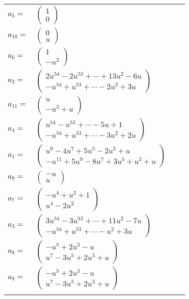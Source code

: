 \documentclass[1p]{elsarticle_modified}
\theoremstyle{definition}
\begin{document}
\begin{tabular}{m{7pt} m{180pt} m{7pt} m{180pt} }
\flushright $a_{5}=$&$\begin{pmatrix}1\\0\end{pmatrix}$ \\
\flushright $a_{10}=$&$\begin{pmatrix}0\\u\end{pmatrix}$ \\
\flushright $a_{6}=$&$\begin{pmatrix}1\\- u^2\end{pmatrix}$ \\
\flushright $a_{2}=$&$\begin{pmatrix}2 u^{54}-2 u^{53}+\cdots+13 u^2-6 u\\- u^{54}+u^{53}+\cdots-2 u^2+3 u\end{pmatrix}$ \\
\flushright $a_{11}=$&$\begin{pmatrix}u\\- u^3+u\end{pmatrix}$ \\
\flushright $a_{4}=$&$\begin{pmatrix}u^{54}- u^{53}+\cdots-5 u+1\\- u^{54}+u^{53}+\cdots-3 u^2+2 u\end{pmatrix}$ \\
\flushright $a_{1}=$&$\begin{pmatrix}u^9-4 u^7+5 u^5-2 u^3+u\\- u^{11}+5 u^9-8 u^7+3 u^5+u^3+u\end{pmatrix}$ \\
\flushright $a_{9}=$&$\begin{pmatrix}- u\\u\end{pmatrix}$ \\
\flushright $a_{7}=$&$\begin{pmatrix}- u^4+u^2+1\\u^4-2 u^2\end{pmatrix}$ \\
\flushright $a_{3}=$&$\begin{pmatrix}3 u^{54}-3 u^{53}+\cdots+11 u^2-7 u\\- u^{54}+u^{53}+\cdots- u^2+3 u\end{pmatrix}$ \\
\flushright $a_{8}=$&$\begin{pmatrix}- u^5+2 u^3- u\\u^7-3 u^5+2 u^3+u\end{pmatrix}$\\ \flushright $a_{8}=$&$\begin{pmatrix}- u^5+2 u^3- u\\u^7-3 u^5+2 u^3+u\end{pmatrix}$\\&\end{tabular}
\end{document}
